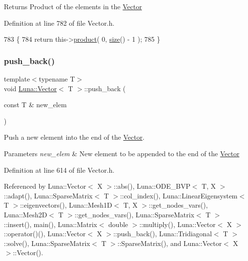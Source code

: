 \begin{DoxyReturn}{Returns}
Product of the elements in the \hyperlink{classLuna_1_1Vector}{Vector} 
\end{DoxyReturn}


Definition at line 782 of file Vector.\+h.


\begin{DoxyCode}
783   \{
784     \textcolor{keywordflow}{return} this->\hyperlink{classLuna_1_1Vector_ac5b4435a746e0894b8b4caa893b53619}{product}( 0, \hyperlink{classLuna_1_1Vector_ac9b6ed7a0df401728f27c193fbc8f4d8}{size}() - 1 );
785   \}
\end{DoxyCode}
\mbox{\label{classLuna_1_1Vector_abf2693db9286f81cf68693fc4fb9fd18}} 
\subsubsection{\texorpdfstring{push\+\_\+back()}{push\_back()}}
{\footnotesize\ttfamily template$<$typename T$>$ \\
void \hyperlink{classLuna_1_1Vector}{Luna\+::\+Vector}$<$ T $>$\+::push\+\_\+back (\begin{DoxyParamCaption}\item[{const T \&}]{new\+\_\+elem }\end{DoxyParamCaption})\hspace{0.3cm}{\ttfamily [inline]}}



Push a new element into the end of the \hyperlink{classLuna_1_1Vector}{Vector}. 


\begin{DoxyParams}{Parameters}
{\em new\+\_\+elem} & New element to be appended to the end of the \hyperlink{classLuna_1_1Vector}{Vector} \\
\hline
\end{DoxyParams}


Definition at line 614 of file Vector.\+h.



Referenced by Luna\+::\+Vector$<$ X $>$\+::abs(), Luna\+::\+O\+D\+E\+\_\+\+B\+V\+P$<$ T, X $>$\+::adapt(), Luna\+::\+Sparse\+Matrix$<$ T $>$\+::col\+\_\+index(), Luna\+::\+Linear\+Eigensystem$<$ T $>$\+::eigenvectors(), Luna\+::\+Mesh1\+D$<$ T, X $>$\+::get\+\_\+nodes\+\_\+vars(), Luna\+::\+Mesh2\+D$<$ T $>$\+::get\+\_\+nodes\+\_\+vars(), Luna\+::\+Sparse\+Matrix$<$ T $>$\+::insert(), main(), Luna\+::\+Matrix$<$ double $>$\+::multiply(), Luna\+::\+Vector$<$ X $>$\+::operator()(), Luna\+::\+Vector$<$ X $>$\+::push\+\_\+back(), Luna\+::\+Tridiagonal$<$ T $>$\+::solve(), Luna\+::\+Sparse\+Matrix$<$ T $>$\+::\+Sparse\+Matrix(), and Luna\+::\+Vector$<$ X $>$\+::\+Vector().


